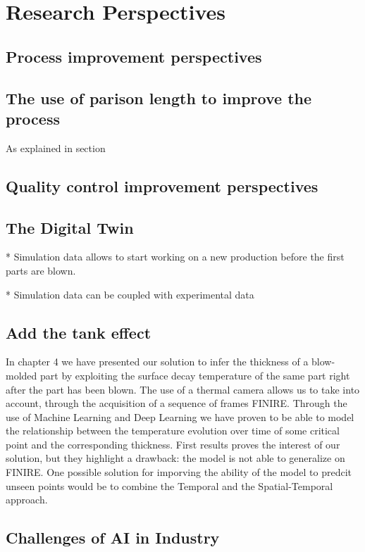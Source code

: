\section{Research Perspectives}

\subsection{Process improvement perspectives}

\subsection{The use of parison length to improve the process}

As explained in section 


\subsection{Quality control improvement perspectives}

\subsection{The Digital Twin}
* Simulation data allows to start working on a new production before the first parts are blown.

* Simulation data can be coupled with experimental data

\subsection{Add the tank effect}

In chapter 4 we have presented our solution to infer the thickness of a blow-molded part by exploiting the surface decay temperature of the same part right after the part has been blown. The use of a thermal camera allows us to take into account, through the acquisition of a sequence of frames FINIRE.
Through the use of Machine Learning and Deep Learning we have proven to be able to model the relationship between the temperature evolution over time of some critical point and the corresponding thickness. First results proves the interest of our solution, but they highlight a drawback: the model is not able to generalize on FINIRE. One possible solution for imporving the ability of the model to predcit unseen points would be to combine the Temporal and the Spatial-Temporal approach. 



\subsection{Challenges of AI in Industry}


